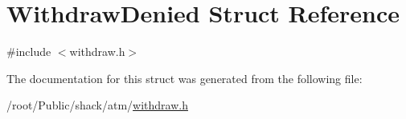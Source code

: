 \hypertarget{structWithdrawDenied}{\section{Withdraw\-Denied Struct Reference}
\label{structWithdrawDenied}
}


{\ttfamily \#include $<$withdraw.\-h$>$}



The documentation for this struct was generated from the following file\-:\begin{DoxyCompactItemize}
\item 
/root/\-Public/shack/atm/\hyperlink{withdraw_8h}{withdraw.\-h}\end{DoxyCompactItemize}
